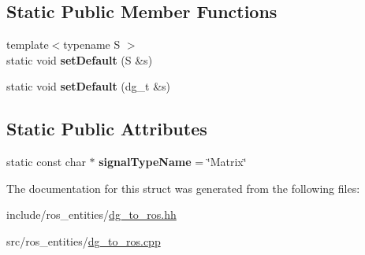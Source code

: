 \subsection*{Static Public Member Functions}
\begin{DoxyCompactItemize}
\item 
{\footnotesize template$<$typename S $>$ }\\static void {\bfseries set\+Default} (S \&s)\hypertarget{structdynamic__graph_1_1DgToRos_3_01Matrix_01_4_a4c32ea6763c10fad6c10f65d60177ea0}{}\label{structdynamic__graph_1_1DgToRos_3_01Matrix_01_4_a4c32ea6763c10fad6c10f65d60177ea0}

\item 
static void {\bfseries set\+Default} (dg\+\_\+t \&s)\hypertarget{structdynamic__graph_1_1DgToRos_3_01Matrix_01_4_a2dbd196e96c7b672a7953911d7dc7700}{}\label{structdynamic__graph_1_1DgToRos_3_01Matrix_01_4_a2dbd196e96c7b672a7953911d7dc7700}

\end{DoxyCompactItemize}
\subsection*{Static Public Attributes}
\begin{DoxyCompactItemize}
\item 
static const char $\ast$ {\bfseries signal\+Type\+Name} = \char`\"{}Matrix\char`\"{}\hypertarget{structdynamic__graph_1_1DgToRos_3_01Matrix_01_4_a67981664123dbd7194d1ceb6e370fcd6}{}\label{structdynamic__graph_1_1DgToRos_3_01Matrix_01_4_a67981664123dbd7194d1ceb6e370fcd6}

\end{DoxyCompactItemize}


The documentation for this struct was generated from the following files\+:\begin{DoxyCompactItemize}
\item 
include/ros\+\_\+entities/\hyperlink{dg__to__ros_8hh}{dg\+\_\+to\+\_\+ros.\+hh}\item 
src/ros\+\_\+entities/\hyperlink{dg__to__ros_8cpp}{dg\+\_\+to\+\_\+ros.\+cpp}\end{DoxyCompactItemize}
